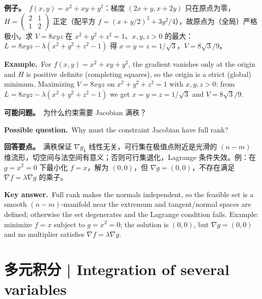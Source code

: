 \documentclass[UTF8,11pt,a4paper]{ctexart}
\newcommand{\EX}[2]{\par\noindent\textbf{例子。}\ #1\par\noindent\textbf{Example.}\ #2\par}
\newcommand{\ASK}[4]{\begin{samepage}\par\noindent\textbf{可能问题。}\ #1\par\noindent\textbf{Possible question.}\ #2\par\noindent\textbf{回答要点。}\ #3\par\noindent\textbf{Key answer.}\ #4\medskip\end{samepage}}
\begin{document}
\EX{$f(x,y)=x^2+xy+y^2$：梯度 $(2x+y,x+2y)$ 只在原点为零，$H=\begin{pmatrix}2&1\\1&2\end{pmatrix}$ 正定（配平方 $f=(x+y/2)^2+3y^2/4$），故原点为（全局）严格极小。求 $V=8xyz$ 在 $x^2+y^2+z^2=1$、$x,y,z>0$ 的最大：$L=8xyz-\lambda(x^2+y^2+z^2-1)$ 得 $x=y=z=1/\sqrt3$，$V=8\sqrt3/9$。}{For $f(x,y)=x^2+xy+y^2$, the gradient vanishes only at the origin and $H$ is positive definite (completing squares), so the origin is a strict (global) minimum. Maximizing $V=8xyz$ on $x^2+y^2+z^2=1$ with $x,y,z>0$: from $L=8xyz-\lambda(x^2+y^2+z^2-1)$ we get $x=y=z=1/\sqrt3$ and $V=8\sqrt3/9$.}
\ASK{为什么约束需要 Jacobian 满秩？}{Why must the constraint Jacobian have full rank?}{满秩保证 $\nabla g_k$ 线性无关，可行集在极值点附近是光滑的 $(n-m)$ 维流形，切空间与法空间有意义；否则可行集退化，Lagrange 条件失效。例：在 $g=x^2=0$ 下最小化 $f=x$，解为 $(0,0)$，但 $\nabla g=(0,0)$，不存在满足 $\nabla f=\lambda\nabla g$ 的乘子。}{Full rank makes the normals independent, so the feasible set is a smooth $(n-m)$-manifold near the extremum and tangent/normal spaces are defined; otherwise the set degenerates and the Lagrange condition fails. Example: minimize $f=x$ subject to $g=x^2=0$; the solution is $(0,0)$, but $\nabla g=(0,0)$ and no multiplier satisfies $\nabla f=\lambda\nabla g$.}

\section{多元积分 | Integration of several variables}
\end{document}
